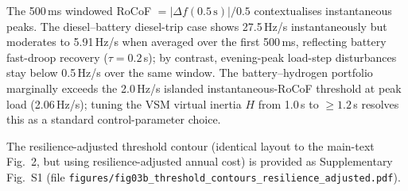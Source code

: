 \documentclass[11pt]{article}
\begin{document}
The 500\,ms windowed RoCoF $= |\Delta f(0.5\,\text{s})| / 0.5$ contextualises instantaneous peaks. The diesel--battery diesel-trip case shows 27.5\,Hz/s instantaneously but moderates to 5.91\,Hz/s when averaged over the first 500\,ms, reflecting battery fast-droop recovery ($\tau = 0.2$\,s); by contrast, evening-peak load-step disturbances stay below 0.5\,Hz/s over the same window. The battery--hydrogen portfolio marginally exceeds the 2.0\,Hz/s islanded instantaneous-RoCoF threshold at peak load (2.06\,Hz/s); tuning the VSM virtual inertia $H$ from 1.0\,s to $\geq 1.2$\,s resolves this as a standard control-parameter choice.

The resilience-adjusted threshold contour (identical layout to the main-text Fig.~2, but using resilience-adjusted annual cost) is provided as Supplementary Fig.~S1 (file \texttt{figures/fig03b\_threshold\_contours\_resilience\_adjusted.pdf}).
\end{document}
